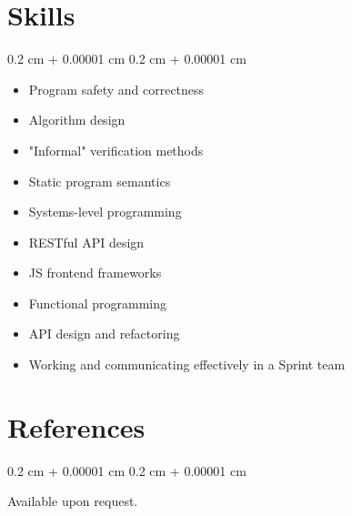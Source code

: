 \documentclass[10pt, a4paper]{article}
\newenvironment{highlightsforbulletentries}{
    \begin{itemize}[
        topsep=0.10 cm,
        parsep=0.10 cm,
        partopsep=0pt,
        itemsep=0pt,
        leftmargin=10pt
    ]
}{
    \end{itemize}
} %
\newenvironment{onecolentry}{
    \begin{adjustwidth}{
        0.2 cm + 0.00001 cm
    }{
        0.2 cm + 0.00001 cm
    }
}{
    \end{adjustwidth}
} %
\begin{document}
    
    \section{Skills}

    \begin{onecolentry}
        \begin{highlightsforbulletentries}


        \item Program safety and correctness

        \item Algorithm design

        \item "Informal" verification methods

        \item Static program semantics

        \item Systems-level programming

        \item RESTful API design

        \item JS frontend frameworks

        \item Functional programming

        \item API design and refactoring

        \item Working and communicating effectively in a Sprint team


        \end{highlightsforbulletentries}
    \end{onecolentry}

    \section{References}



        
        \begin{onecolentry}
            Available upon request.
        \end{onecolentry}


    
\end{document}
